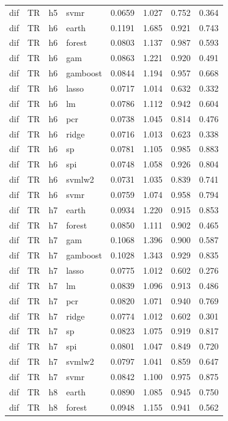 \begin{ThreePartTable}
\begin{longtable}[t]{llclcccc}
dif & TR & h5 & svmr & 0.0659 & 1.027 & 0.752 & 0.364\\
\addlinespace
dif & TR & h6 & earth & 0.1191 & 1.685 & 0.921 & 0.743\\
dif & TR & h6 & forest & 0.0803 & 1.137 & 0.987 & 0.593\\
dif & TR & h6 & gam & 0.0863 & 1.221 & 0.920 & 0.491\\
dif & TR & h6 & gamboost & 0.0844 & 1.194 & 0.957 & 0.668\\
dif & TR & h6 & lasso & 0.0717 & 1.014 & 0.632 & 0.332\\
dif & TR & h6 & lm & 0.0786 & 1.112 & 0.942 & 0.604\\
dif & TR & h6 & pcr & 0.0738 & 1.045 & 0.814 & 0.476\\
dif & TR & h6 & ridge & 0.0716 & 1.013 & 0.623 & 0.338\\
dif & TR & h6 & sp & 0.0781 & 1.105 & 0.985 & 0.883\\
dif & TR & h6 & spi & 0.0748 & 1.058 & 0.926 & 0.804\\
dif & TR & h6 & svmlw2 & 0.0731 & 1.035 & 0.839 & 0.741\\
dif & TR & h6 & svmr & 0.0759 & 1.074 & 0.958 & 0.794\\
\addlinespace
dif & TR & h7 & earth & 0.0934 & 1.220 & 0.915 & 0.853\\
dif & TR & h7 & forest & 0.0850 & 1.111 & 0.902 & 0.465\\
dif & TR & h7 & gam & 0.1068 & 1.396 & 0.900 & 0.587\\
dif & TR & h7 & gamboost & 0.1028 & 1.343 & 0.929 & 0.835\\
dif & TR & h7 & lasso & 0.0775 & 1.012 & 0.602 & 0.276\\
dif & TR & h7 & lm & 0.0839 & 1.096 & 0.913 & 0.486\\
dif & TR & h7 & pcr & 0.0820 & 1.071 & 0.940 & 0.769\\
dif & TR & h7 & ridge & 0.0774 & 1.012 & 0.602 & 0.301\\
dif & TR & h7 & sp & 0.0823 & 1.075 & 0.919 & 0.817\\
dif & TR & h7 & spi & 0.0801 & 1.047 & 0.849 & 0.720\\
dif & TR & h7 & svmlw2 & 0.0797 & 1.041 & 0.859 & 0.647\\
dif & TR & h7 & svmr & 0.0842 & 1.100 & 0.975 & 0.875\\
\addlinespace
dif & TR & h8 & earth & 0.0890 & 1.085 & 0.945 & 0.750\\
dif & TR & h8 & forest & 0.0948 & 1.155 & 0.941 & 0.562\\

\end{longtable}
\end{ThreePartTable}
